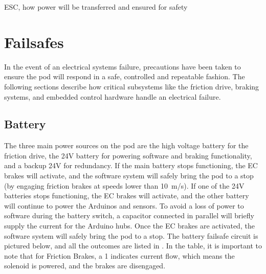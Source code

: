 \documentclass[main.tex]{subfiles}
\begin{document}
    ESC, how power will be transferred and ensured for safety

    \section{Failsafes}
    In the event of an electrical systems failure, precautions have been taken to ensure the pod will respond in a safe, controlled and repeatable fashion. The following sections describe how critical subsystems like the friction drive, braking systems, and embedded control hardware handle an electrical failure.
    \subsection{Battery}
    The three main power sources on the pod are the high voltage battery for the friction drive, the 24V battery for powering software and braking functionality, and a backup 24V for redundancy.  If the main battery stops functioning, the EC brakes will activate, and the software system will safely bring the pod to a stop (by engaging friction brakes at speeds lower than \SI{10}{m/s}). If one of the 24V batteries stops functioning, the EC brakes will activate, and the other battery will continue to power the Arduinos and sensors. To avoid a loss of power to software during the battery switch, a capacitor connected in parallel will briefly supply the current for the Arduino hubs. Once the EC brakes are activated, the software system will safely bring the pod to a stop. The battery failsafe circuit is pictured below, and all the outcomes are listed in . In the table, it is important to note that for Friction Brakes, a 1 indicates current flow, which means the solenoid is powered, and the brakes are disengaged.
\end{document}
